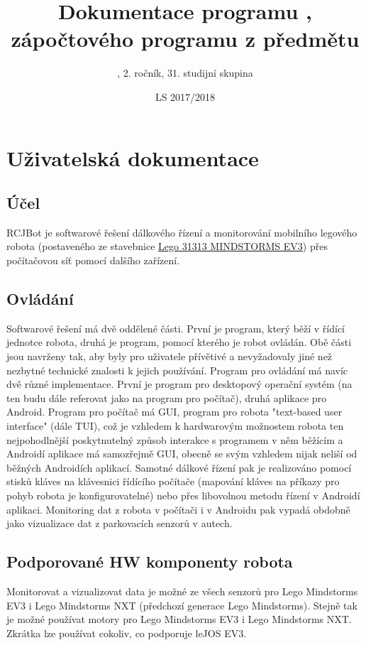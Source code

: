 \documentclass[12pt, ngerman]{article}
\title{Dokumentace programu \PROGRAM, zápočtového programu z předmětu \PREDMET}
\date{LS 2017/2018}
\author{\AUTOR, 2. ročník, 31. studijní skupina}
\begin{document}
\maketitle
\newpage
{}

\section{Uživatelská dokumentace}
\subsection{Účel}
RCJBot je softwarové řešení dálkového řízení a monitorování mobilního legového robota (postaveného ze stavebnice \href{https://www.lego.com/en-us/mindstorms/products/mindstorms-ev3-31313}{Lego 31313 MINDSTORMS EV3}) přes počítačovou síť pomocí dalšího zařízení.

\subsection{Ovládání}
Softwarové řešení má dvě oddělené části. První je program, který běží v řídící jednotce robota, druhá je program, pomocí kterého je robot ovládán. Obě části jsou navrženy tak, aby byly pro uživatele přívětivé a nevyžadovaly jiné než nezbytné technické znalosti k jejich používání. Program pro ovládání má navíc dvě různé implementace. První je program pro desktopový operační systém (na ten budu dále referovat jako na program pro počítač), druhá aplikace pro Android. Program pro počítač má GUI, program pro robota "text-based user interface" (dále TUI), což je vzhledem k hardwarovým možnostem robota ten nejpohodlnější poskytnutelný způsob interakce s programem v něm běžícím a Androidí aplikace má samozřejmě GUI, obecně se svým vzhledem nijak neliší od běžných Androidích aplikací. Samotné dálkové řízení pak je realizováno pomocí stisků kláves na klávesnici řídícího počítače (mapování kláves na příkazy pro pohyb robota je konfigurovatelné) nebo přes libovolnou metodu řízení v Androidí aplikaci. Monitoring dat z robota v počítači i v Androidu pak vypadá obdobně jako vizualizace dat z parkovacích senzorů v autech.

\subsection{Podporované HW komponenty robota}
Monitorovat a vizualizovat data je možné ze všech senzorů pro Lego Mindstorms EV3 i Lego Mindstorms NXT (předchozí generace Lego Mindstorms). Stejně tak je možné používat motory pro Lego Mindstorms EV3 i Lego Mindstorms NXT. Zkrátka lze používat cokoliv, co podporuje leJOS EV3.
\end{document}
